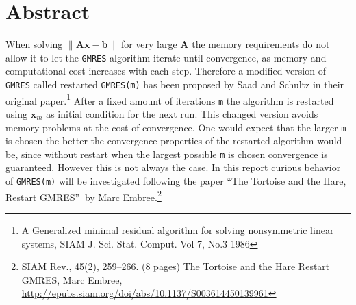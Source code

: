 \section{Abstract}
When solving $\|\mathbf{Ax} - \mathbf{b}\|$ for very large $\mathbf{A}$
the memory requirements do not allow it to let the \texttt{GMRES} algorithm iterate until convergence, as memory and computational cost increases with each step. Therefore a modified version of \texttt{GMRES} called restarted \texttt{GMRES(m)} has been proposed by Saad and Schultz in their original paper.\footnote{A Generalized minimal residual algorithm for solving nonsymmetric linear systems, SIAM J. Sci. Stat. Comput. Vol 7, No.3 1986} After a fixed amount of iterations \texttt{m} the algorithm is restarted using $\mathbf{x}_m$ as initial condition for the next run. This changed version  avoids memory problems at the cost of convergence. One would expect that the larger \texttt{m} is chosen the better the convergence properties of the restarted algorithm would be, since without restart when the largest possible \texttt{m} is chosen convergence is guaranteed. However this is not always the case. In this report curious behavior of \texttt{GMRES(m)} will be investigated following the paper \textquotedblleft The Tortoise and the Hare, Restart GMRES\textquotedblright $\:$ by Marc Embree.\footnote{SIAM Rev., 45(2), 259–266. (8 pages) The Tortoise and the Hare Restart GMRES, Marc Embree,
\url{http://epubs.siam.org/doi/abs/10.1137/S003614450139961}}
